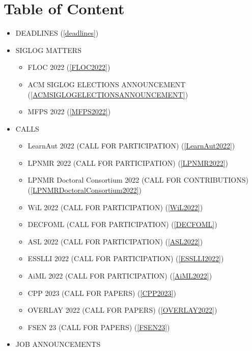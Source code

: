 \documentclass[prodmode,acmtecs]{acmsmall} %
\begin{document}
\section{Table of Content}\begin{itemize}\item DEADLINES (\cref{deadlines}) 
 
\item SIGLOG MATTERS 
 
\begin{itemize}\item FLOC 2022 (\cref{FLOC2022})
\item ACM SIGLOG ELECTIONS ANNOUNCEMENT (\cref{ACMSIGLOGELECTIONSANNOUNCEMENT})
\item MFPS 2022 (\cref{MFPS2022})
\end{itemize} 
\item CALLS 
 
\begin{itemize}\item LearnAut 2022 (CALL FOR PARTICIPATION) (\cref{LearnAut2022})
\item LPNMR 2022 (CALL FOR PARTICIPATION) (\cref{LPNMR2022})
\item LPNMR Doctoral Consortium 2022 (CALL FOR CONTRIBUTIONS) (\cref{LPNMRDoctoralConsortium2022})
\item WiL 2022 (CALL FOR PARTICIPATION) (\cref{WiL2022})
\item DECFOML (CALL FOR PARTICIPATION) (\cref{DECFOML})
\item ASL 2022 (CALL FOR PARTICIPATION) (\cref{ASL2022})
\item ESSLLI 2022 (CALL FOR PARTICIPATION) (\cref{ESSLLI2022})
\item AiML 2022 (CALL FOR PARTICIPATION) (\cref{AiML2022})
\item CPP 2023 (CALL FOR PAPERS) (\cref{CPP2023})
\item OVERLAY 2022 (CALL FOR PAPERS) (\cref{OVERLAY2022})
\item FSEN 23 (CALL FOR PAPERS) (\cref{FSEN23})
\end{itemize} 
\item JOB ANNOUNCEMENTS 
 

\end{itemize}
\end{document}
